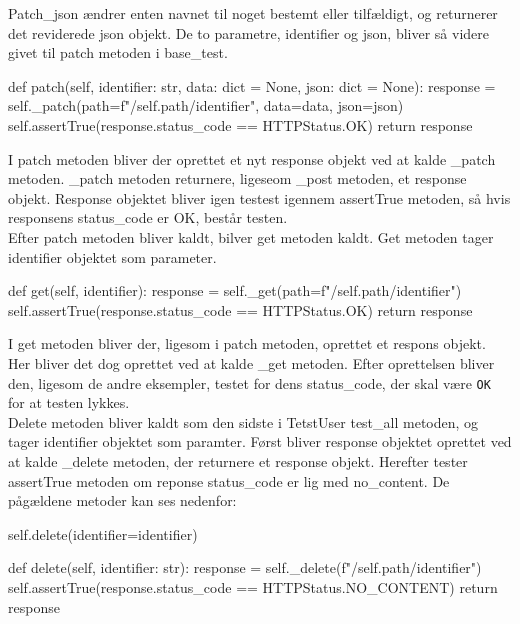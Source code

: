 Patch\_json ændrer enten navnet til noget bestemt eller tilfældigt, og returnerer det reviderede json objekt. De to parametre, identifier og json, bliver så videre givet til patch metoden i base\_test.\\

\begin{code}[language=python, caption=BestTestCase.py, firstnumber=70]
def patch(self, identifier: str, data: dict = None, json: dict = None):
    response = self._patch(path=f"/{self.path}/{identifier}", data=data, json=json)
    self.assertTrue(response.status_code == HTTPStatus.OK)
    return response
\end{code}

I patch metoden bliver der oprettet et nyt response objekt ved at kalde \_patch metoden. \_patch metoden returnere, ligeseom \_post metoden, et response objekt. Response objektet bliver igen testest igennem assertTrue metoden, så hvis responsens status\_code er OK, består testen.\\

Efter patch metoden bliver kaldt, bilver get metoden kaldt. Get metoden tager identifier objektet som parameter. \\

\begin{code}[language=python, caption=BestTestCase.py, firstnumber=60]
def get(self, identifier):
    response = self._get(path=f"/{self.path}/{identifier}")
    self.assertTrue(response.status_code == HTTPStatus.OK)
    return response
\end{code}

I get metoden bliver der, ligesom i patch metoden, oprettet et respons objekt. Her bliver det dog oprettet ved at kalde \_get metoden. Efter oprettelsen bliver den, ligesom de andre eksempler, testet for dens status\_code, der skal være \texttt{OK} for at testen lykkes.\\

Delete metoden bliver kaldt som den sidste i TetstUser test\_all metoden, og tager identifier objektet som paramter. Først bliver response objektet oprettet ved at kalde \_delete metoden, der returnere et response objekt. Herefter tester assertTrue metoden om reponse status\_code er lig med no\_content. De pågældene metoder kan ses nedenfor: \\

\begin{code}[language=python, caption=UsersTest.py, firstnumber=17]
self.delete(identifier=identifier)
\end{code}

\begin{code}[language=python, caption=BestCaseTest.py, firstnumber=80]
def delete(self, identifier: str):
    response = self._delete(f"/{self.path}/{identifier}")
    self.assertTrue(response.status_code == HTTPStatus.NO_CONTENT)
    return response
\end{code}